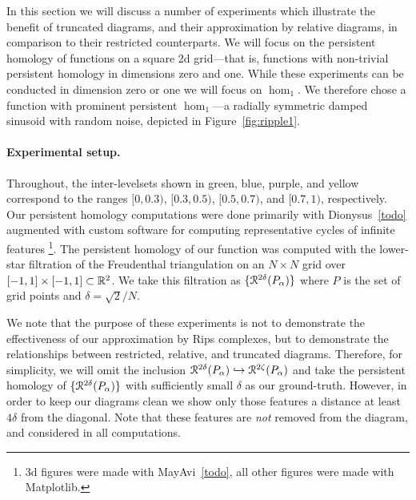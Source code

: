 
In this section we will discuss a number of experiments which illustrate the benefit of truncated diagrams, and their approximation by relative diagrams, in comparison to their restricted counterparts.
We will focus on the persistent homology of functions on a square 2d grid---that is, functions with non-trivial persistent homology in dimensions zero and one.
While these experiments can be conducted in dimension zero or one we will focus on $\hom_1$.
We therefore chose a function with prominent persistent $\hom_1$---a radially symmetric damped sinusoid with random noise, depicted in Figure~\ref{fig:ripple1}.

\paragraph{Experimental setup.}

Throughout, the inter-levelsets shown in green, blue, purple, and yellow correspond to the ranges $[0, 0.3)$, $[0.3, 0.5)$, $[0.5, 0.7)$, and $[0.7, 1)$, respectively.
Our persistent homology computations were done primarily with Dionysus~\ref{todo} augmented with custom software for computing representative cycles of infinite features
\footnote{3d figures were made with MayAvi~\ref{todo}, all other figures were made with Matplotlib.}.
The persistent homology of our function was computed with the lower-star filtration of the Freudenthal triangulation on an $N\times N$ grid over $[-1,1]\times[-1,1]\subset\mathbb{R}^2$.
We take this filtration as $\{\mathcal{R}^{2\delta}(P_\alpha)\}$ where $P$ is the set of grid points and $\delta = \sqrt{2} / N$.

We note that the purpose of these experiments is not to demonstrate the effectiveness of our approximation by Rips complexes, but to demonstrate the relationships between restricted, relative, and truncated diagrams.
Therefore, for simplicity, we will omit the inclusion $\mathcal{R}^{2\delta}(P_\alpha)\hookrightarrow\mathcal{R}^{2\zeta}(P_\alpha)$ and take the persistent homology of $\{\mathcal{R}^{2\delta}(P_\alpha)\}$ with sufficiently small $\delta$ as our ground-truth.
However, in order to keep our diagrams clean we show only those features a distance at least $4\delta$ from the diagonal.
Note that these features are \emph{not} removed from the diagram, and considered in all computations.

